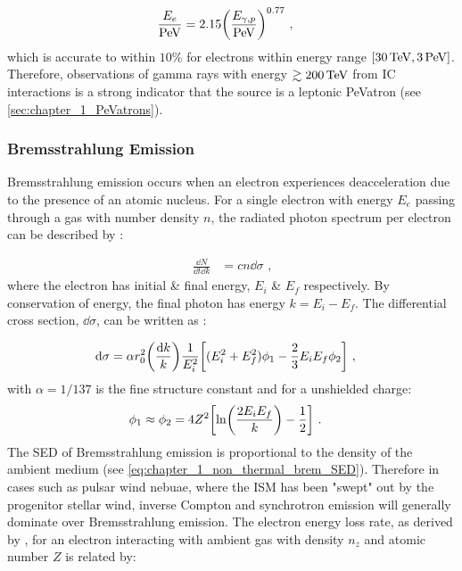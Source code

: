 \begin{equation}
    \begin{aligned}
    \frac{E_e}{\PeV}&=2.15 \qty(\frac{E_{\gamma,p}}{\PeV})^{0.77}\text{ ,}
    \end{aligned}
\end{equation}
which is accurate to within $10\%$ for electrons within energy range $[30\,\TeV,3\,\PeV]$. Therefore, observations of gamma rays with energy $\gtrsim 200\,\TeV$ from IC interactions is a strong indicator that the source is a leptonic PeVatron (see \autoref{sec:chapter_1_PeVatrons}).

\subsubsection{Bremsstrahlung Emission}

Bremsstrahlung emission occurs when an electron experiences deacceleration due to the presence of an atomic nucleus. For a single electron with energy $E_e$ passing through a gas with number density $n$, the radiated photon spectrum per electron can be described by \citep{RevModPhys.42.237}:

\begin{equation}
	\begin{split}
		\frac{\dd{N}}{\dd{t}\dd{k}}&=cn\dd{\sigma} \text{ ,}
	\end{split} \label{eq:chapter_1_non_thermal_brem_SED}
\end{equation}
\noindent where the electron has initial \& final energy, $E_i$ \& $E_f$ respectively. By conservation of energy, the final photon has energy $k=E_i-E_f$. The differential cross section, $\dd{\sigma}$, can be written as \citep{1934RSPSA.146...83B}:

\begin{equation}
	\begin{split}
		\dd{\sigma}&=\alpha r_0^2\qty(\frac{\dd{k}}{k})\frac{1}{E_i^2}\qty[(E_i^2+E_f^2)\phi_1-\frac{2}{3}E_i E_f\phi_2]\text{ ,} \label{eq:chapter_1_non_thermal_brem_cross_section} 
	\end{split}
\end{equation}
\noindent with $\alpha=1/137$ is the fine structure constant and for a unshielded charge:
\begin{equation}
    \begin{aligned}
        \phi_1&\approx\phi_2=4Z^2\qty[\ln(\frac{2E_iE_f}{k})-\frac{1}{2}]\text{ .}
    \end{aligned}
\end{equation}
\newpar
The SED of Bremsstrahlung emission is proportional to the density of the ambient medium (see \autoref{eq:chapter_1_non_thermal_brem_SED}). Therefore in cases such as pulsar wind nebuae, where the ISM has been "swept" out by the progenitor stellar wind, inverse Compton and synchrotron emission will generally dominate over Bremsstrahlung emission. The electron energy loss rate, as derived by \cite{RevModPhys.42.237}, for an electron interacting with ambient gas with density $n_z$ and atomic number $Z$ is related by:

